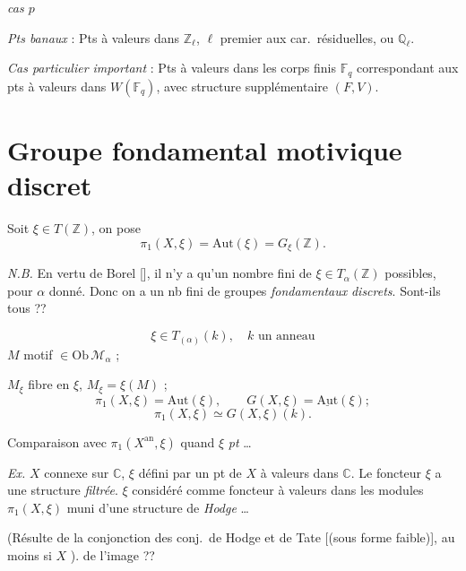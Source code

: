 \documentclass[11pt,a4paper]{article}
\begin{document}
\struck{\ill{}} \emph{cas $p$}

\emph{Pts banaux} : Pts à valeurs dans $\boxed{\mathbb{Z}_\ell}$, $\ell$
premier aux car.\ résiduelles, ou $\boxed{\mathbb{Q}_\ell}$.

\emph{Cas particulier important} : Pts à valeurs dans les corps finis
$\mathbb{F}_q$ correspondant aux pts à valeurs dans
$\boxed{W(\mathbb{F}_q)}$, avec structure supplémentaire $(F, V)$.

\section{Groupe fondamental motivique discret}

Soit $\xi \in T(\mathbb{Z})$, on pose
\[
  \pi_1(X, \xi) = \mathrm{Aut}(\xi) = G_\xi(\mathbb{Z}) .
\]

\emph{N.B.} En vertu de Borel [], il n'y a qu'un nombre
fini de $\xi \in T_\alpha(\mathbb{Z})$ possibles, pour $\alpha$ donné. Donc on
a un nb fini de groupes \emph{fondamentaux} \emph{discrets}. Sont-ils tous
 \ill{} \struck{\ill{}} \ill{} ??

\[
  \xi \in T_{(\alpha)}(k), \quad k \text{ un anneau}
\]
$M$ motif $\in \mathrm{Ob}\,\mathcal{M}_\alpha$ ;

$M_\xi$ fibre en $\xi$, \quad $M_\xi = \xi(M)$ ;
\[
  \pi_1(X,\xi) = \mathrm{Aut}(\xi), \qquad G(X,\xi) =
  \underline{\mathrm{Aut}}(\xi) ;
\]
\[
  \pi_1(X,\xi) \simeq G(X,\xi)(k) .
\]

Comparaison avec $\pi_1(X^{\mathrm{an}}, \xi)$ quand $\xi$  \emph{pt} \ill{} …

\emph{Ex.} $X$ connexe sur $\mathbb{C}$, $\xi$ défini par un pt de $X$ à
valeurs dans $\mathbb{C}$. Le foncteur $\xi$ \struck{\ill{}} a une
structure \emph{filtrée}. $\xi$ considéré comme foncteur à valeurs dans les
modules \ill{} \ill{} $\pi_1(X,\xi)$ muni d'une structure de
\emph{Hodge} \ill{} \ill{} …

(Résulte de la conjonction des conj.\ de Hodge et de Tate [(sous forme
faible)], au moins si $X$ ). 
 de l'image ??
\end{document}
